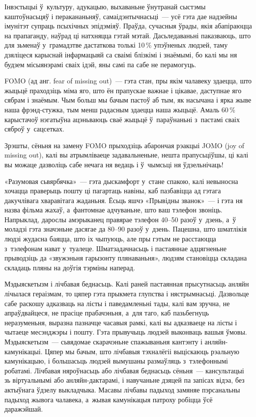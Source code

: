 Інвэстыцыі ў~культуру, адукацыю, выхаваньне ўнутранай сыстэмы каштоўнасьцяў і перакананьняў, самаідэнтычнасьці~--- усё гэта дае надзейны імунітэт супраць псыхічных эпідэміяў. Праўда, сучасныя ўрады, якія абапіраюцца на прапаганду, наўрад ці натхняцца гэтай мэтай. Дасьледаваньні паказваюць, што для зьменаў у~грамадзтве дастаткова толькі 10\,\% упэўненых людзей, таму дзяліцеся карыснай інфармацыяй са сваімі блізкімі і знаёмымі, бо калі мы ня будзем місыянэрамі сваіх ідэй, яны самі па сабе не перамогуць.

FOMO (ад анг. fear of missing out)~--- гэта стан, пры якім чалавеку здаецца, што жыцьцё праходзіць міма яго, што ён прапускае важнае і цікавае, даступнае яго сябрам і знаёмым. Чым больш мы бачым пастоў аб тым, як насычана і ярка жыве наша фрэнд-стужка, тым менш радасным здаецца наша жыцьцё. Амаль 60\,\% карыстачоў нэгатыўна ацэньваюць сваё жыцьцё ў~параўнаньні з~пастамі сваіх сяброў у~сацсетках. 

Зрэшты, сёньня на замену FOMO прыходзіць абарончая рэакцыі JOMO (joy of missing out), калі вы атрымліваеце задавальненьне, нешта прапусьціўшы, ці калі вы можаце дазволіць сабе нечага ня ведаць і ў~чымсьці ня ўдзельнічаць!

«Разумовая сьвярбячка»~--- гэта дыскамфорт у~стане спакою, калі невыносна хочацца праверыць пошту ці пагартаць навіны, каб пазбавіцца ад гэтага дакучлівага хваравітага жаданьня. Ёсьць яшчэ «Прывідны званок»~--- і гэта ня назва фільма жахаў, а~фантомнае адчуваньне, што ваш тэлефон звоніць. Напрыклад, дарослы амэрыканец правярае тэлефон 40--50 разоў у~дзень, а~ў моладзі гэта значэньне дасягае да 80--90 разоў у~дзень. Пацешна, што шматлікія людзі жудасна баяцца, што іх чыпуюць, але пры гэтым не расстаюцца з~тэлефонам нават у~туалеце. Шматзадачнасьць і пастаяннае адцягненьне прыводзіць да «звужэньня гарызонту плянаваньня», людзям становіцца складана складаць пляны на доўгія тэрміны наперад.

Мэдыяскетызм і лічбавая беднасьць. Калі раней пастаянная прысутнасьць анляйн лічылася гераізмам, то цяпер гэта прыкмета глупства і нястрымнасьці. Дазвольце сабе раскошу адказваць на лісты і паведамленьні тады, калі вам зручна, не апраўдвайцеся, не прасіце прабачэньня, а~для таго, каб пазьбегнуць неразуменьня, выразна пазначце часавыя рамкі, калі вы адказваеце на лісты і чытаеце месэнджэры і пошту. Гэта прывучыць людзей выконваць вашыя ўмовы. Мэдыяскетызм~--- сьвядомае скарачэньне спажываньня кантэнту і анляйн-камунікацыі. Цяпер мы бачым, што лічбавыя тэхналёгіі выціскаюць рэальную камунікацыю, і большасьць людзей вымушаны размаўляць з~тэлефоннымі робатамі. Лічбавая няроўнасьць або лічбавая беднасьць сёньня~--- кансультацыі зь віртуальнымі або анляйн-дактарамі, і навучаньне дзяцей па запісах відэа, без актыўнага ўдзелу выкладчыка. Масавы лічбавы падыход замяняе пэрсанальны падыход жывога чалавека, а~жывая камунікацыя патроху робіцца ўсё даражэйшай.

